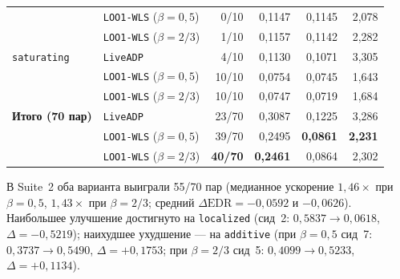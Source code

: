\documentclass[11pt,a4paper]{article}
\numberwithin{equation}{section}
\theoremstyle{definition}
\theoremstyle{remark}
\begin{document}
\begin{table}[htbp]
\begin{tabular}{@{}llrrrr@{}}
                        & \texttt{LOO1-WLS} ($\beta=0{,}5$) & 0/10 & 0,1147 & 0,1145 & 2,078 \\
                        & \texttt{LOO1-WLS} ($\beta=2/3$)   & 1/10 & 0,1157 & 0,1142 & 2,282 \\
\addlinespace[2pt]
\texttt{saturating}     & \texttt{LiveADP}              & 4/10 & 0,1130 & 0,1071 & 3,305 \\
                        & \texttt{LOO1-WLS} ($\beta=0{,}5$) & 10/10 & 0,0754 & 0,0745 & 1,643 \\
                        & \texttt{LOO1-WLS} ($\beta=2/3$)   & 10/10 & 0,0747 & 0,0719 & 1,684 \\
\midrule
\textbf{Итого (70 пар)} & \texttt{LiveADP}              & 23/70 & 0,3087 & 0,1225 & 3,286 \\
                        & \texttt{LOO1-WLS} ($\beta=0{,}5$) & 39/70 & 0,2495 & \textbf{0,0861} & \textbf{2,231} \\
                        & \texttt{LOO1-WLS} ($\beta=2/3$)   & \textbf{40/70} & \textbf{0,2461} & 0,0864 & 2,302 \\
\bottomrule
\end{tabular}
\end{table}

В Suite~2 оба варианта выиграли 55/70 пар (медианное ускорение $1{,}46\times$ при $\beta=0{,}5$,
$1{,}43\times$ при $\beta=2/3$; средний $\Delta\text{EDR} = -0{,}0592$ и $-0{,}0626$).
Наибольшее улучшение достигнуто на \texttt{localized} (сид~2: $0{,}5837 \to 0{,}0618$, $\Delta = -0{,}5219$);
наихудшее ухудшение — на \texttt{additive} (при $\beta=0{,}5$ сид~7: $0{,}3737 \to 0{,}5490$, $\Delta = +0{,}1753$;
при $\beta=2/3$ сид~5: $0{,}4099 \to 0{,}5233$, $\Delta = +0{,}1134$).
\end{document}
